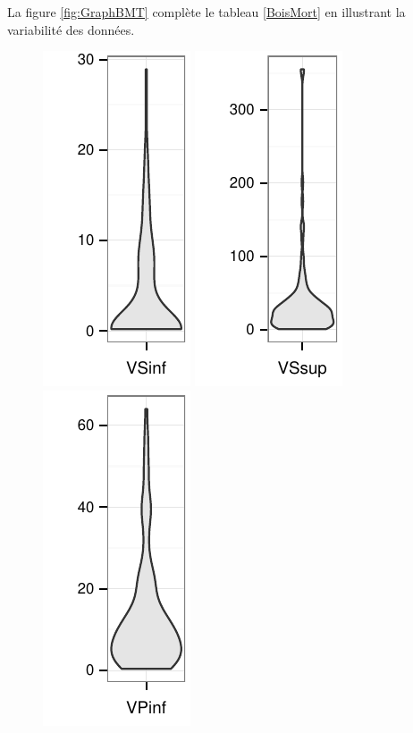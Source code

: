 \documentclass[a4paper]{book}\usepackage[]{graphicx}\usepackage[]{color}
\makeatletter
\def\maxwidth{ %
  \ifdim\Gin@nat@width>\linewidth
    \linewidth
  \else
    \Gin@nat@width
  \fi
}
\newenvironment{knitrout}{}{} %
\makeatother
\begin{document}
La figure \ref{fig:GraphBMT} complète le tableau \ref{BoisMort} en illustrant la variabilité des données.
\begin{knitrout}\footnotesize
{}\color{fgcolor}\begin{figure}[H]


{\centering \includegraphics[width=\maxwidth]{Figures/GraphBMT-1} 
\includegraphics[width=\maxwidth]{Figures/GraphBMT-2} 
\includegraphics[width=\maxwidth]{Figures/GraphBMT-3} 
}
\end{figure}
\end{knitrout}
\end{document}

